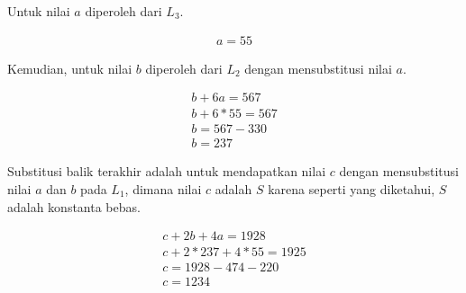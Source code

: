 Untuk nilai \begin{math}a\end{math} diperoleh dari \begin{math}L_3\end{math}.
\begin{center}
	\begin{gather*}
		a = 55
	\end{gather*}
\end{center}

\begin{flushleft}
	Kemudian, untuk nilai \begin{math}b\end{math} diperoleh dari \begin{math}L_2\end{math} dengan mensubstitusi nilai \begin{math}a\end{math}.
\end{flushleft}

\begin{center}
	\begin{gather*}
		b + 6a = 567 \\
		b + 6*55 = 567 \\
		b = 567 - 330 \\
		b = 237
	\end{gather*}
\end{center}

\begin{flushleft}
	Substitusi balik terakhir adalah untuk mendapatkan nilai \begin{math}c\end{math} dengan mensubstitusi nilai \begin{math}a\end{math} dan \begin{math}b\end{math} pada \begin{math}L_1\end{math}, dimana nilai \begin{math}c\end{math} adalah \begin{math}S\end{math} karena seperti yang diketahui, \begin{math}S\end{math} adalah konstanta bebas.
\end{flushleft}

\begin{center}
	\begin{gather*}
		c + 2b + 4a = 1928 \\
		c + 2*237 + 4*55 = 1925 \\
		c = 1928 - 474 - 220 \\
		c = 1234
	\end{gather*}
\end{center}


